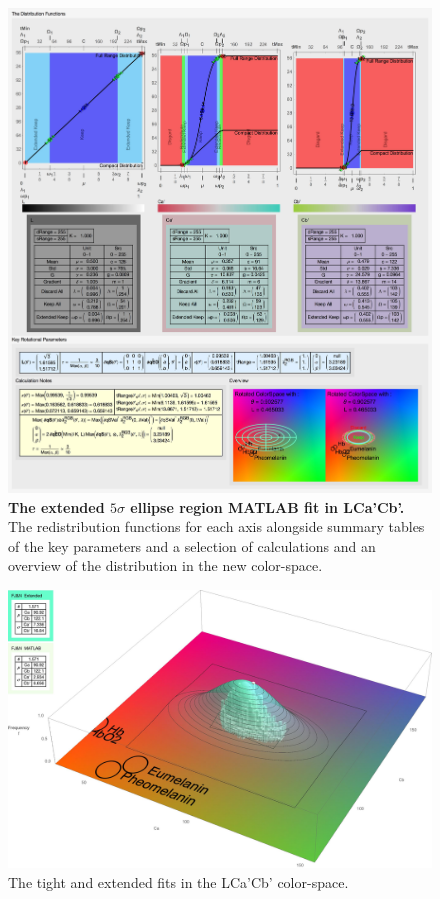 \begin{figure}[h!]
  \centering
  \includegraphics[width=1.0 \textwidth]{Chapter3/Figs/Distribution_Results_Final_Extended.jpg} 
    \caption{ \textbf{The extended $5\sigma$ ellipse region MATLAB fit in LCa'Cb'.} The redistribution functions for each axis alongside summary tables of the key parameters and a selection of calculations and an overview of the distribution in the new color-space. }  \label{fig:DistributionResultsFinalExtended}
\end{figure}

\begin{figure}[h!]
  \centering
  \includegraphics[width=0.95 \textwidth]{Chapter3/Figs/Distribution_Results_Final_Extended_3D.jpg} 
    \caption{ The tight and extended fits in the LCa'Cb' color-space.}  \label{fig:DistributionResultsFinalExtended3D}
\end{figure}

